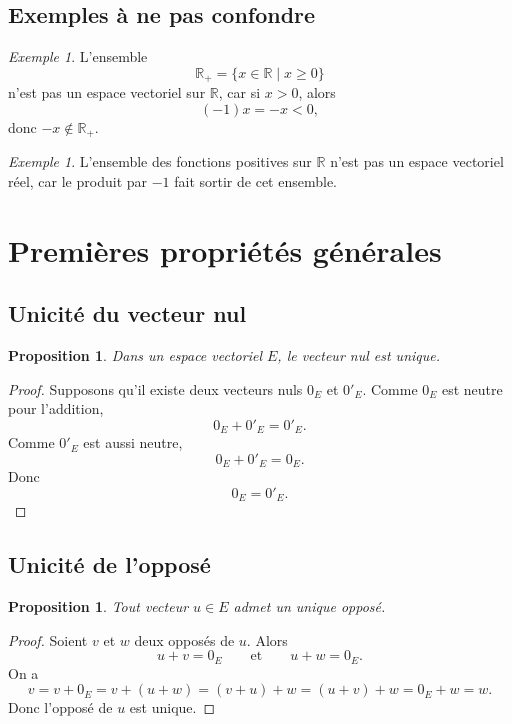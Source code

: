 \documentclass[11pt,a4paper]{article}
\newtheorem{proposition}[definition]{Proposition}
\theoremstyle{remark}
\newtheorem{exemple}[definition]{Exemple}
\newcommand{\R}{\mathbb{R}}
\begin{document}
\subsection{Exemples à ne pas confondre}

\begin{exemple}
L’ensemble
\[
\R_+=\{x\in\R\mid x\geq 0\}
\]
n’est pas un espace vectoriel sur \(\R\), car si \(x>0\), alors
\[
(-1)x=-x<0,
\]
donc \(-x\notin \R_+\).
\end{exemple}

\begin{exemple}
L’ensemble des fonctions positives sur \(\R\) n’est pas un espace vectoriel réel, car le produit par \(-1\) fait sortir de cet ensemble.
\end{exemple}

\section{Premières propriétés générales}

\subsection{Unicité du vecteur nul}

\begin{proposition}
Dans un espace vectoriel \(E\), le vecteur nul est unique.
\end{proposition}

\begin{proof}
Supposons qu’il existe deux vecteurs nuls \(0_E\) et \(0'_E\).  
Comme \(0_E\) est neutre pour l’addition,
\[
0_E+0'_E=0'_E.
\]
Comme \(0'_E\) est aussi neutre,
\[
0_E+0'_E=0_E.
\]
Donc
\[
0_E=0'_E.
\]
\end{proof}

\subsection{Unicité de l’opposé}

\begin{proposition}
Tout vecteur \(u\in E\) admet un unique opposé.
\end{proposition}

\begin{proof}
Soient \(v\) et \(w\) deux opposés de \(u\). Alors
\[
u+v=0_E
\qquad \text{et} \qquad
u+w=0_E.
\]
On a
\[
v=v+0_E=v+(u+w)=(v+u)+w=(u+v)+w=0_E+w=w.
\]
Donc l’opposé de \(u\) est unique.
\end{proof}
\end{document}
